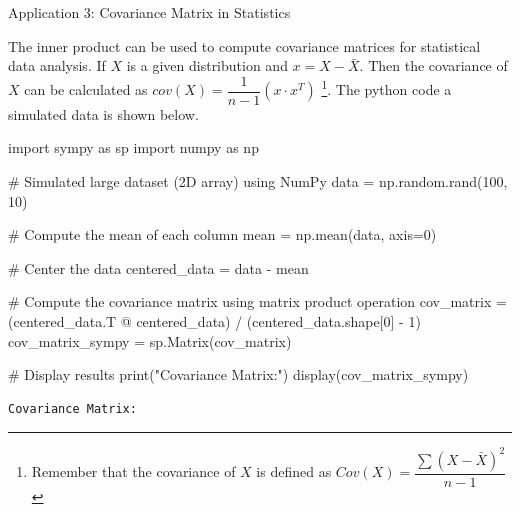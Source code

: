 \documentclass[
  letterpaper,
  DIV=11,
  numbers=noendperiod]{scrreprt}
\newenvironment{Shaded}{\begin{snugshade}}{\end{snugshade}}
\newcommand{\BuiltInTok}[1]{\textcolor[rgb]{0.00,0.23,0.31}{#1}}
\newcommand{\CommentTok}[1]{\textcolor[rgb]{0.37,0.37,0.37}{#1}}
\newcommand{\DecValTok}[1]{\textcolor[rgb]{0.68,0.00,0.00}{#1}}
\newcommand{\ImportTok}[1]{\textcolor[rgb]{0.00,0.46,0.62}{#1}}
\newcommand{\NormalTok}[1]{\textcolor[rgb]{0.00,0.23,0.31}{#1}}
\newcommand{\OperatorTok}[1]{\textcolor[rgb]{0.37,0.37,0.37}{#1}}
\newcommand{\StringTok}[1]{\textcolor[rgb]{0.13,0.47,0.30}{#1}}
\theoremstyle{plain}
\theoremstyle{definition}
\theoremstyle{remark}
\begin{document}
Application 3: Covariance Matrix in Statistics

The inner product can be used to compute covariance matrices for
statistical data analysis. If \(X\) is a given distribution and
\(x=X-\bar{X}\). Then the covariance of \(X\) can be calculated as
\(cov(X)=\dfrac{1}{n-1}(x\cdot x^T)\) \footnote{Remember that the
  covariance of \(X\) is defined as
  \(Cov(X)=\dfrac{\sum (X-\bar{X})^2}{n-1}\)}. The python code a
simulated data is shown below.

\begin{Shaded}
\begin{Highlighting}[]
\ImportTok{import}\NormalTok{ sympy }\ImportTok{as}\NormalTok{ sp}
\ImportTok{import}\NormalTok{ numpy }\ImportTok{as}\NormalTok{ np}

\CommentTok{\# Simulated large dataset (2D array) using NumPy}
\NormalTok{data }\OperatorTok{=}\NormalTok{ np.random.rand(}\DecValTok{100}\NormalTok{, }\DecValTok{10}\NormalTok{)}

\CommentTok{\# Compute the mean of each column}
\NormalTok{mean }\OperatorTok{=}\NormalTok{ np.mean(data, axis}\OperatorTok{=}\DecValTok{0}\NormalTok{)}

\CommentTok{\# Center the data}
\NormalTok{centered\_data }\OperatorTok{=}\NormalTok{ data }\OperatorTok{{-}}\NormalTok{ mean}

\CommentTok{\# Compute the covariance matrix using matrix product operation}
\NormalTok{cov\_matrix }\OperatorTok{=}\NormalTok{ (centered\_data.T }\OperatorTok{@}\NormalTok{ centered\_data) }\OperatorTok{/}\NormalTok{ (centered\_data.shape[}\DecValTok{0}\NormalTok{] }\OperatorTok{{-}} \DecValTok{1}\NormalTok{)}
\NormalTok{cov\_matrix\_sympy }\OperatorTok{=}\NormalTok{ sp.Matrix(cov\_matrix)}

\CommentTok{\# Display results}
\BuiltInTok{print}\NormalTok{(}\StringTok{"Covariance Matrix:"}\NormalTok{)}
\NormalTok{display(cov\_matrix\_sympy)}
\end{Highlighting}
\end{Shaded}

\begin{verbatim}
Covariance Matrix:
\end{verbatim}
\end{document}
